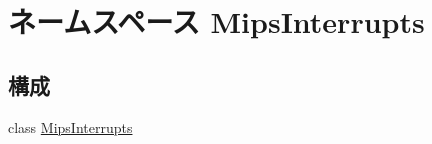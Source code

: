 \hypertarget{namespaceMipsInterrupts}{
\section{ネームスペース MipsInterrupts}
\label{namespaceMipsInterrupts}
}
\subsection*{構成}
\begin{DoxyCompactItemize}
\item 
class \hyperlink{classMipsInterrupts_1_1MipsInterrupts}{MipsInterrupts}
\end{DoxyCompactItemize}
